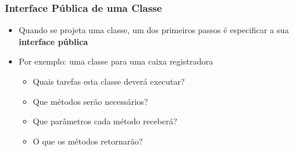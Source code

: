\documentclass[xcolor={dvipsnames,table},aspectratio=169]{beamer}
\begin{document}
\begin{frame}\frametitle{Interface Pública de uma Classe}
\begin{itemize}
	\item Quando se projeta uma classe, um dos primeiros passos é especificar a sua \textbf{interface pública}
	\item Por exemplo: uma classe para uma caixa registradora
	\begin{itemize}
		\item Quais tarefas esta classe deverá executar?
		\item Que métodos serão necessários?
		\item Que parâmetros cada método receberá?
		\item O que os métodos retornarão?
	\end{itemize}
\end{itemize}
{\footnotesize
\begin{center}
\end{center}
}
\end{frame}
\end{document}
